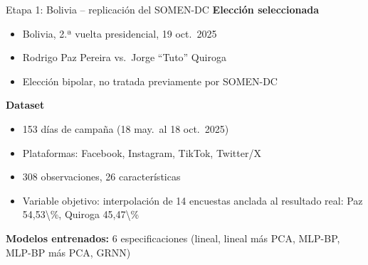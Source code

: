 \begin{frame}{Etapa 1: Bolivia -- replicación del SOMEN-DC}
  \textbf{Elección seleccionada}
  \begin{itemize}
    \item Bolivia, 2.ª vuelta presidencial, 19 oct.\ 2025
    \item Rodrigo Paz Pereira vs.\ Jorge ``Tuto'' Quiroga
    \item Elección bipolar, no tratada previamente por SOMEN-DC
  \end{itemize}
  \vspace{0.4em}
  \textbf{Dataset}
  \begin{itemize}
    \item \num{153} días de campaña (18 may.\ al 18 oct.\ 2025)
    \item Plataformas: Facebook, Instagram, TikTok, Twitter/X
    \item \num{308} observaciones, \num{26} características
    \item Variable objetivo: interpolación de \num{14} encuestas
          anclada al resultado real: Paz \num{54,53\%}, Quiroga \num{45,47\%}
  \end{itemize}
  \vspace{0.4em}
  \textbf{Modelos entrenados:} 6 especificaciones
  (lineal, lineal más PCA, MLP-BP, MLP-BP más PCA, GRNN)
\end{frame}

\addtocounter{framenumber}{1}

